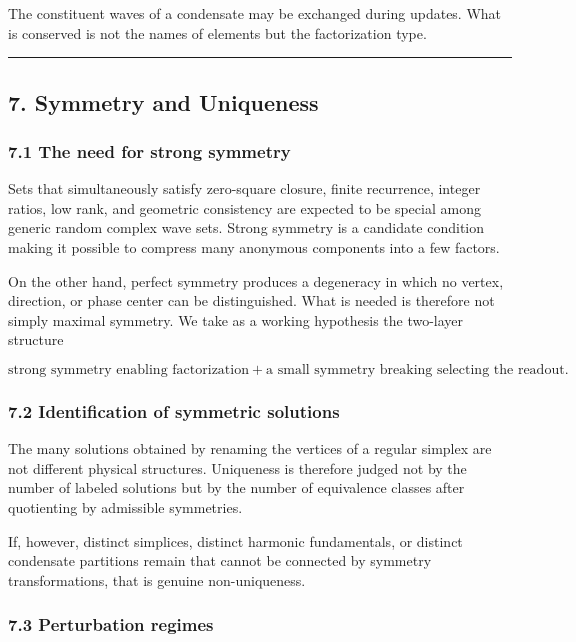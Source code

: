 \documentclass[
  a4paper,
]{article}
\begin{document}
The constituent waves of a condensate may be exchanged during updates.
What is conserved is not the names of elements but the factorization
type.

\begin{center}\rule{0.5\linewidth}{0.5pt}\end{center}

\subsection{7. Symmetry and Uniqueness}\label{symmetry-and-uniqueness}

\subsubsection{7.1 The need for strong
symmetry}\label{the-need-for-strong-symmetry}

Sets that simultaneously satisfy zero-square closure, finite recurrence,
integer ratios, low rank, and geometric consistency are expected to be
special among generic random complex wave sets. Strong symmetry is a
candidate condition making it possible to compress many anonymous
components into a few factors.

On the other hand, perfect symmetry produces a degeneracy in which no
vertex, direction, or phase center can be distinguished. What is needed
is therefore not simply maximal symmetry. We take as a working
hypothesis the two-layer structure

\[
\text{strong symmetry enabling factorization}
+
\text{a small symmetry breaking selecting the readout}.
\]

\subsubsection{7.2 Identification of symmetric
solutions}\label{identification-of-symmetric-solutions}

The many solutions obtained by renaming the vertices of a regular
simplex are not different physical structures. Uniqueness is therefore
judged not by the number of labeled solutions but by the number of
equivalence classes after quotienting by admissible symmetries.

If, however, distinct simplices, distinct harmonic fundamentals, or
distinct condensate partitions remain that cannot be connected by
symmetry transformations, that is genuine non-uniqueness.

\subsubsection{7.3 Perturbation regimes}\label{perturbation-regimes}
\end{document}
